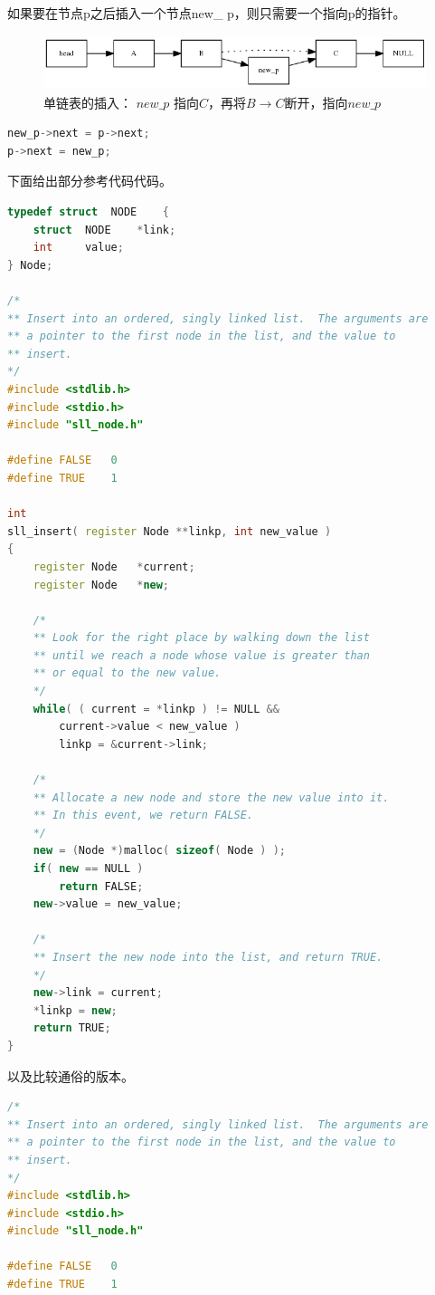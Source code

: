 \documentclass[a4paper]{article}
\begin{document}
\begin{CJK}{UTF8}{gbsn}
如果要在节点p之后插入一个节点new\_ p，则只需要一个指向p的指针。

\begin{figure}[htbp]
\centering\includegraphics[height=1.6cm]{linklist3.png}
\caption{单链表的插入： $new\_p$ 指向$C$，再将$B\rightarrow C$断开，指向$new\_ p$}
\end{figure}

\begin{lstlisting}[language=C++]
new_p->next = p->next;
p->next = new_p;
\end{lstlisting}

下面给出部分参考代码代码。
\begin{lstlisting}[language=C++]
typedef	struct	NODE	{
	struct	NODE	*link;
	int		value;
} Node;

/*
** Insert into an ordered, singly linked list.  The arguments are
** a pointer to the first node in the list, and the value to
** insert.
*/
#include <stdlib.h>
#include <stdio.h>
#include "sll_node.h"

#define	FALSE	0
#define TRUE	1

int
sll_insert( register Node **linkp, int new_value )
{
	register Node	*current;
	register Node	*new;

	/*
	** Look for the right place by walking down the list
	** until we reach a node whose value is greater than
	** or equal to the new value.
	*/
	while( ( current = *linkp ) != NULL &&
	    current->value < new_value )
		linkp = &current->link;

	/*
	** Allocate a new node and store the new value into it.
	** In this event, we return FALSE.
	*/
	new = (Node *)malloc( sizeof( Node ) );
	if( new == NULL )
		return FALSE;
	new->value = new_value;

	/*
	** Insert the new node into the list, and return TRUE.
	*/
	new->link = current;
	*linkp = new;
	return TRUE;
}
\end{lstlisting}

以及比较通俗的版本。
\begin{lstlisting}[language=C++]
/*
** Insert into an ordered, singly linked list.  The arguments are
** a pointer to the first node in the list, and the value to
** insert.
*/
#include <stdlib.h>
#include <stdio.h>
#include "sll_node.h"

#define	FALSE	0
#define	TRUE	1


\end{lstlisting}
\end{CJK}
\end{document}
